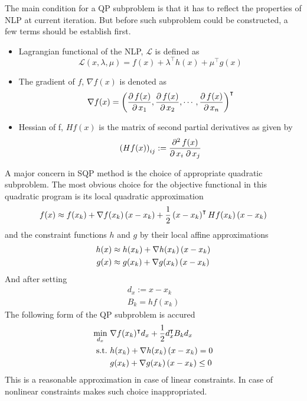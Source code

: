 The main condition for a QP subproblem is that it has to reflect the properties of NLP at current iteration. But before such subproblem could be constructed, a few terms should be establish first.
\begin{itemize}
	\item Lagrangian functional of the NLP, $\mathcal{L}$ is defined as\begin{equation}
		\mathcal{L}(x,\lambda,\mu) = f(x) + \lambda^\intercal h(x) + \mu^\intercal g(x) 
	\end{equation}
	\item The gradient of $f$, $\nabla f(x)$ is denoted as
	\begin{equation}
		\nabla f(x) = \left( \frac{\partial\, f(x)}{\partial\, x_1},\frac{\partial\, f(x)}{\partial\, x_2},\cdots,\frac{\partial\, f(x)}{\partial\, x_n} \right)^\intercal
	\end{equation}
	\item Hessian of f, $Hf(x)$ is the matrix of second partial derivatives as given by
	\begin{equation}
		\left( Hf(x) \right)_{ij} := \frac{\partial^2\, f(x)}{\partial\, x_i\; \partial\, x_j}
	\end{equation}
\end{itemize}
A major concern in SQP method is the choice of appropriate quadratic subproblem. 
The most obvious choice for the objective functional in this quadratic program is its local quadratic approximation
\begin{equation}
f(x)\approx f(x_k)+\nabla f(x_k)\left( x-x_k \right)+\frac{1}{2}\left( x-x_k \right)^\intercal Hf(x_k)\left( x-x_k \right)
\end{equation}
and the constraint functions $h$ and $g$ by their local affine approximations
\begin{subequations}
	\begin{align}
		h(x)&\approx h(x_k)+\nabla h(x_k)\left( x-x_k \right)\\
		g(x)&\approx g(x_k)+\nabla g(x_k)\left( x-x_k \right)	
	\end{align}
\end{subequations}
And after setting 
\begin{subequations}
	\begin{align}
		d_x:=x-x_k\\
		B_k = hf(x_k)
	\end{align}
\end{subequations}
The following form of the QP subproblem is accured
\begin{subequations}
	\begin{align}
		\min_{d_x}\  &\nabla f(x_k)^\intercal d_x+\frac{1}{2}d_x^\intercal B_k d_x\\
		\text{s.t.}\  &h(x_k)+\nabla h(x_k)\left( x-x_k \right) = 0\\
		&g(x_k)+\nabla g(x_k)\left( x-x_k \right)\leq 0
	\end{align}
\end{subequations}
This is a reasonable approximation in case of linear constraints. In case of nonlinear constraints makes such choice inappropriated. 

